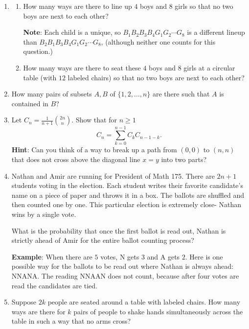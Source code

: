 \documentclass[11pt]{article}
\begin{document}
\begin{enumerate}

\item 
\begin{enumerate}
\item How many ways are there to line up $4$ boys and $8$ girls so that no two boys are next to each other?  

{\bf Note}: Each child is a unique, so $B_1 B_2 B_3 B_4 G_1 G_2 \cdots G_8$ is a different lineup than $B_2 B_1 B_3 B_4 G_1 G_2 \cdots G_8$, (although neither one counts for this question.)

\item How many ways are there to seat these $4$ boys and $8$ girls at a circular table (with $12$ labeled chairs) so that no two boys are next to each other?
\end{enumerate}

\item How many pairs of subsets $A, B$ of $\{1,2,\ldots, n\}$ are there such that $A$ is contained in $B$?

\item Let $C_n = \frac{1}{n+1} \binom{2n}{n}$.  Show that for $n\ge 1$
\[
C_n = \sum_{k=0}^{n-1} C_k C_{n-1-k}.
\]
{\bf Hint}: Can you think of a way to break up a path from $(0,0)$ to $(n,n)$ that does not cross above the diagonal line $x=y$ into two parts?

\vspace{1 cm}

\item Nathan and Amir are running for President of Math 175.  There are $2n+1$ students voting in the election.  Each student writes their favorite candidate's name on a piece of paper and throws it in a box.  The ballots are shuffled and then counted one by one.  This particular election is extremely close- Nathan wins by a single vote.

What is the probability that once the first ballot is read out, Nathan is strictly ahead of Amir for the entire ballot counting process?

{\bf Example}: When there are $5$ votes, N gets $3$ and A gets $2$.  Here is one possible way for the ballots to be read out where Nathan is always ahead: NNANA.  The reading NNAAN does not count, because after four votes are read the candidates are tied.

\vspace{.5 cm}

\item Suppose $2k$ people are seated around a table with labeled chairs.  How many ways are there for $k$ pairs of people to shake hands simultaneously across the table in such a way that no arms cross?


\end{enumerate}
\end{document}
